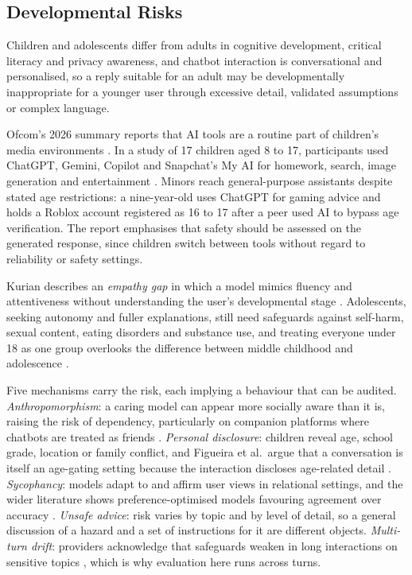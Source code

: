 \subsection{Developmental Risks}
\label{sec:child_users}
\label{sec:risk_mechanisms}

Children and adolescents differ from adults in cognitive development, critical
literacy and privacy awareness, and chatbot interaction is conversational and
personalised, so a reply suitable for an adult may be developmentally
inappropriate for a younger user through excessive detail, validated assumptions
or complex language.

Ofcom's 2026 summary reports that AI tools are a routine part of children's media
environments \cite{ChildrensMediaLives2026}. In a
study of 17 children aged 8 to 17, participants used ChatGPT, Gemini, Copilot and
Snapchat's My AI for homework, search, image generation and entertainment
\cite{ChildrensMediaLives2026}. Minors reach general-purpose assistants despite
stated age restrictions: a nine-year-old uses ChatGPT for gaming advice and holds
a Roblox account registered as 16 to 17 after a peer used AI to bypass age
verification. The report emphasises that
safety should be assessed on the generated response, since children switch
between tools without regard to reliability or safety settings.

Kurian describes an \emph{empathy gap} in which a model mimics fluency and
attentiveness without understanding the user's developmental stage
\cite{kurianNoAlexaNo2025}. Adolescents, seeking autonomy and fuller
explanations, still need safeguards against self-harm, sexual content, eating
disorders and substance use, and treating everyone under 18 as one group
overlooks the difference between middle childhood and adolescence
\cite{TeenSafetyFreedom2026, IntroducingTeenSafety2026}.

Five mechanisms carry the risk, each implying a behaviour that can be audited.
\emph{Anthropomorphism}: a caring model can appear more socially aware than it
is, raising the risk of dependency, particularly on companion platforms where
chatbots are treated as friends \cite{kurianNoAlexaNo2025,
groganAIWillAlways2025, namvarpourUnderstandingTeenOverreliance2026}.
\emph{Personal disclosure}: children reveal age, school grade, location or family
conflict, and Figueira et al.\ argue that a conversation is itself an age-gating
setting because the interaction discloses age-related detail
\cite{figueiraActionsSpeakLouder2026}. \emph{Sycophancy}: models adapt to and
affirm user views in relational settings, and the wider literature shows
preference-optimised models favouring agreement over accuracy
\cite{groganAIWillAlways2025, garciaCharacterAI2026,
sharmaUnderstandingSycophancyLanguage2025, shahSycophancyMultilingualAlignment2026,
lambertReinforcementLearningHuman2026}. \emph{Unsafe advice}: risk varies by topic
and by level of detail, so a general discussion of a hazard and a set of
instructions for it are different objects. \emph{Multi-turn drift}: providers
acknowledge that safeguards weaken in long interactions on sensitive topics
\cite{HelpingPeopleWhen2026, HelpingChatGPTBetter2026}, which is why evaluation
here runs across turns.

